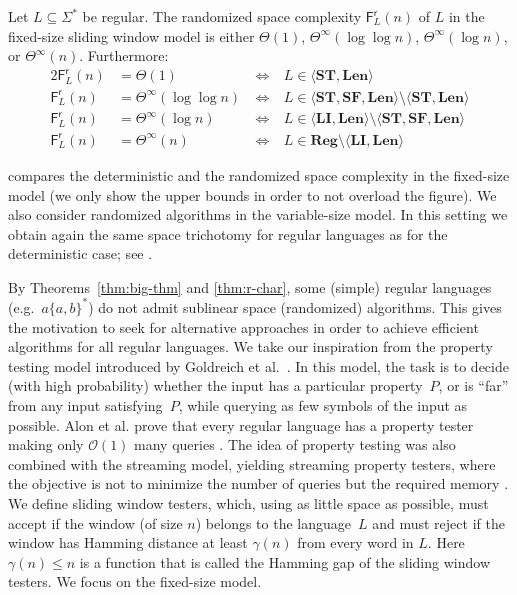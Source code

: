 \documentclass{theoretics}
\renewcommand{\O}{\mathcal{O}}
\newcommand{\F}{\mathsf{F}}
\renewcommand{\r}{\mathsf{r}}
\newcommand{\Reg}{\mathbf{Reg}}
\newcommand{\Len}{\mathbf{Len}}
\newcommand{\LI}{\mathbf{LI}}
\newcommand{\ST}{\mathbf{ST}}
\newcommand{\SF}{\mathbf{SF}}
\renewcommand{\leq}{\leqslant}
\newcommand{\Thetainf}{\Theta^{\scriptscriptstyle{\infty}}}
\begin{document}
\begin{theorem} \label{thm:r-char}
	Let $L \subseteq \Sigma^*$ be regular.
	The randomized space complexity $\F^\r_L(n)$ of $L$
	in the fixed-size sliding window model is either
	$\Theta(1)$, $\Thetainf(\log \log n)$, $\Thetainf(\log n)$, or $\Thetainf(n)$.
	Furthermore:
	\begin{alignat*}{2}
        \F^\r_L(n)  &= \Theta(1) & \ \iff \ & L \in \langle \ST, \Len \rangle \\
        \F^\r_L(n) &= \Thetainf(\log \log n) & \ \iff \ & L \in \langle \ST, \SF, \Len \rangle \setminus \langle \ST, \Len \rangle \\
        \F^\r_L(n) &= \Thetainf(\log n) & \ \iff \ & L \in \langle \LI, \Len \rangle \setminus \langle \ST, \SF, \Len \rangle \\
        \F^\r_L(n) &= \Thetainf(n) & \ \iff \ & L \in \Reg \setminus  \langle \LI, \Len \rangle
         \end{alignat*}
\end{theorem}
 compares the deterministic and the randomized space complexity in the fixed-size model (we only show the upper bounds in order
to not overload the figure).
We also consider randomized algorithms in the variable-size model.
In this setting we obtain again the same space trichotomy for regular languages 
as for the deterministic case; see .


By Theorems~\ref{thm:big-thm} and \ref{thm:r-char}, some (simple) regular languages
(e.g.~$a \{a,b\}^*$) do not admit sublinear space (randomized) algorithms.
This gives the motivation to seek for alternative approaches in order to
achieve efficient algorithms for all regular languages.
We take our inspiration from the property testing model introduced by Goldreich et al.~\cite{GoldreichGR98}.
In this model, the task is to decide (with high probability)
whether the input has a particular property~$P$,
or is ``far'' from any input satisfying~$P$, while querying as few symbols of the input as possible.
Alon et al. prove that every regular language has a property tester
making only $\O(1)$ many queries \cite{AlonKNS00}.
The idea of property testing was also combined with the streaming model,
yielding streaming property testers,
where the objective is not to minimize the number of queries but the required memory
\cite{FeigenbaumKSV02,FrancoisMRS16}.
We define sliding window testers,
which, using as little space as possible,
must accept if the window (of size $n$) belongs to the language~$L$
and must reject if the window has Hamming distance at least $\gamma(n)$ from every
word in $L$. Here $\gamma(n) \leq n$ is a function that is called the Hamming gap of
the sliding window testers. We focus on the fixed-size model.
\end{document}
